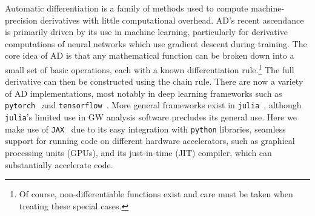 \documentclass[twocolumn]{aastex631}
\newcommand{\jax}{\texttt{JAX}\xspace}
\begin{document}
Automatic differentiation is a family of methods used to compute machine-precision derivatives with little computational overhead. 
AD's recent ascendance is primarily driven by its use in machine learning, particularly for derivative computations of neural networks which use gradient descent during training.
The core idea of AD is that any mathematical function can be broken down into a small set of basic operations, each with a known differentiation rule.\footnote{
    Of course, non-differentiable functions exist and care must be taken when treating these special cases.
    }
The full derivative can then be constructed using the chain rule.
There are now a variety of AD implementations, most notably in deep learning frameworks such as \texttt{pytorch}~\citep{pytorch} and \texttt{tensorflow}~\citep{tensorflow2015-whitepaper}.
More general frameworks exist in \texttt{julia}~\citep{zygote, forwarddiff}, although \texttt{julia}'s limited use in GW analysis software precludes its general use.
Here we make use of \jax~\citep{jax2018github} due to its easy integration with \texttt{python} libraries, seamless support for running code on different hardware accelerators, such as graphical processing units (GPUs), and its just-in-time (JIT) compiler, which can substantially accelerate code.
\end{document}
